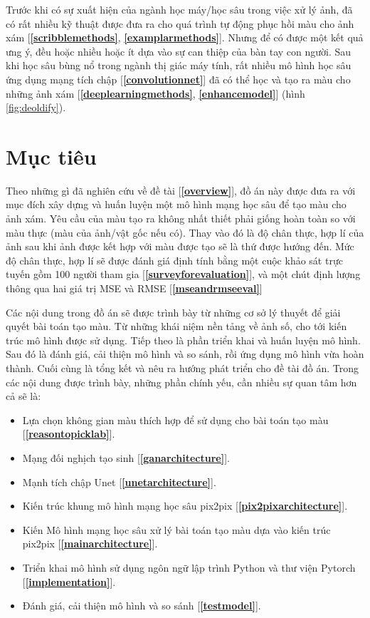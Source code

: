 \documentclass[a4paper, 12pt]{report}
\begin{document}
Trước khi có sự xuất hiện của ngành học máy/học sâu \cite{wikiml2021, wikideeplearning2021} trong việc xử lý ảnh, đã có rất nhiều kỹ thuật được đưa ra cho quá trình tự động phục hồi màu cho ảnh xám [\textbf{\ref{scribblemethods}}, \textbf{\ref{examplarmethods}}].
Nhưng để có được một kết quả ưng ý, đều hoặc nhiều hoặc ít dựa vào sự can thiệp của bàn tay con người.
Sau khi học sâu bùng nổ trong ngành thị giác máy tính, rất nhiều mô hình học sâu ứng dụng mạng tích chập [\textbf{\ref{convolutionnet}}] đã có thể học và tạo ra màu cho những ảnh xám [\textbf{\ref{deeplearningmethods}}, \textbf{\ref{enhancemodel}}] (hình \ref{fig:deoldify}).

\section{Mục tiêu}\label{objective}

Theo những gì đã nghiên cứu về đề tài [\textbf{\ref{overview}}], đồ án này được đưa ra với mục đích xây dựng và huấn luyện một mô hình mạng học sâu để tạo màu cho ảnh xám.
Yêu cầu của màu tạo ra không nhất thiết phải giống hoàn toàn so với màu thực (màu của ảnh/vật gốc nếu có).
Thay vào đó là độ chân thực, hợp lí của ảnh sau khi ảnh được kết hợp với màu được tạo sẽ là thứ được hướng đến.
Mức độ chân thực, hợp lí sẽ được đánh giá định tính bằng một cuộc khảo sát trực tuyến gồm 100 người tham gia [\textbf{\ref{surveyforevaluation}}], và một chút định lượng thông qua hai giá trị MSE và RMSE [\textbf{\ref{mseandrmseeval}}]\vspace{5pt}

Các nội dung trong đồ án sẽ được trình bày từ những cơ sở lý thuyết để giải quyết bài toán tạo màu.
Từ những khái niệm nền tảng về ảnh số, cho tới kiến trúc mô hình được sử dụng.
Tiếp theo là phần triển khai và huấn luyện mô hình.
Sau đó là đánh giá, cải thiện mô hình và so sánh, rồi ứng dụng mô hình vừa hoàn thành.
Cuối cùng là tổng kết và nêu ra hướng phát triển cho đề tài đồ án.
Trong các nội dung được trình bày, những phần chính yếu, cần nhiều sự quan tâm hơn cả sẽ là:

\begin{itemize}
    \item Lựa chọn không gian màu thích hợp để sử dụng cho bài toán tạo màu [\textbf{\ref{reasontopicklab}}].
    \item Mạng đối nghịch tạo sinh [\textbf{\ref{ganarchitecture}}].
    \item Mạnh tích chập Unet [\textbf{\ref{unetarchitecture}}].
    \item Kiến trúc khung mô hình mạng học sâu pix2pix [\textbf{\ref{pix2pixarchitecture}}].
    \item Kiến Mô hình mạng học sâu xử lý bài toán tạo màu dựa vào kiến trúc pix2pix [\textbf{\ref{mainarchitecture}}].
    \item Triển khai mô hình sử dụng ngôn ngữ lập trình Python và thư viện Pytorch [\textbf{\ref{implementation}}].
    \item Đánh giá, cải thiện mô hình và so sánh [\textbf{\ref{testmodel}}].
\end{itemize}
\end{document}
